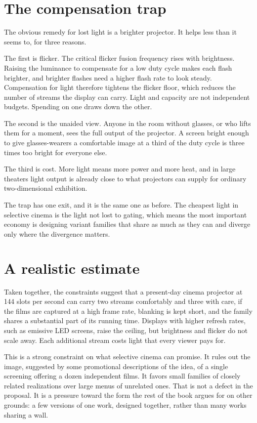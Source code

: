 \section{The compensation trap}

The obvious remedy for lost light is a brighter projector. It helps less than it seems to, for three reasons.

The first is flicker. The critical flicker fusion frequency rises with brightness. Raising the luminance to compensate for a low duty cycle makes each flash brighter, and brighter flashes need a higher flash rate to look steady. Compensation for light therefore tightens the flicker floor, which reduces the number of streams the display can carry. Light and capacity are not independent budgets. Spending on one draws down the other.

The second is the unaided view. Anyone in the room without glasses, or who lifts them for a moment, sees the full output of the projector. A screen bright enough to give glasses-wearers a comfortable image at a third of the duty cycle is three times too bright for everyone else.

The third is cost. More light means more power and more heat, and in large theaters light output is already close to what projectors can supply for ordinary two-dimensional exhibition.

The trap has one exit, and it is the same one as before. The cheapest light in selective cinema is the light not lost to gating, which means the most important economy is designing variant families that share as much as they can and diverge only where the divergence matters.

\section{A realistic estimate}

Taken together, the constraints suggest that a present-day cinema projector at 144 slots per second can carry two streams comfortably and three with care, if the films are captured at a high frame rate, blanking is kept short, and the family shares a substantial part of its running time. Displays with higher refresh rates, such as emissive LED screens, raise the ceiling, but brightness and flicker do not scale away. Each additional stream costs light that every viewer pays for.

This is a strong constraint on what selective cinema can promise. It rules out the image, suggested by some promotional descriptions of the idea, of a single screening offering a dozen independent films. It favors small families of closely related realizations over large menus of unrelated ones. That is not a defect in the proposal. It is a pressure toward the form the rest of the book argues for on other grounds: a few versions of one work, designed together, rather than many works sharing a wall.
